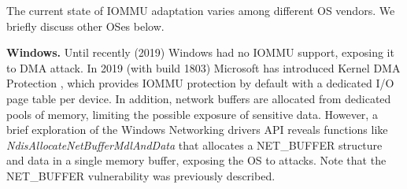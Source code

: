 
The current state of IOMMU adaptation varies among different OS vendors. We briefly discuss other OSes below.

\smallskip
\noindent\textbf{Windows.} Until recently (2019) Windows had no IOMMU support, exposing it to \simple DMA attack.
In 2019 (with build 1803) Microsoft has introduced Kernel DMA Protection \cite{ms_iommu}, which provides IOMMU protection by default with a dedicated I/O page table per device. 
In addition, network buffers are allocated from dedicated pools of memory, limiting the possible exposure of sensitive data. However, a brief exploration of the Windows Networking drivers API reveals functions like \emph{NdisAllocateNetBufferMdlAndData} \cite{ms_single} that allocates a NET\_BUFFER structure and data in a single memory buffer, exposing the OS to \simple attacks. 
Note that the NET\_BUFFER vulnerability was previously described\cite{thunder}. 

